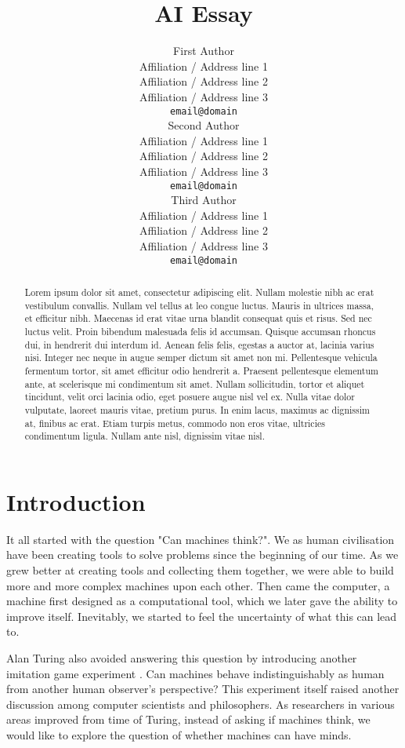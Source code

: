 \documentclass[11pt]{article}
\title{AI Essay}
\author{First Author \\
  Affiliation / Address line 1 \\
  Affiliation / Address line 2 \\
  Affiliation / Address line 3 \\
  {\tt email@domain} \\\And
  Second Author \\
  Affiliation / Address line 1 \\
  Affiliation / Address line 2 \\
  Affiliation / Address line 3 \\
  {\tt email@domain} \\\And
  Third Author \\
  Affiliation / Address line 1 \\
  Affiliation / Address line 2 \\
  Affiliation / Address line 3 \\
  {\tt email@domain} \\}
\date{}
\begin{document}
\maketitle
\begin{abstract}
Lorem ipsum dolor sit amet, consectetur adipiscing elit. Nullam molestie nibh ac erat vestibulum convallis. Nullam vel tellus at leo congue luctus. Mauris in ultrices massa, et efficitur nibh. Maecenas id erat vitae urna blandit consequat quis et risus. Sed nec luctus velit. Proin bibendum malesuada felis id accumsan. Quisque accumsan rhoncus dui, in hendrerit dui interdum id. Aenean felis felis, egestas a auctor at, lacinia varius nisi. Integer nec neque in augue semper dictum sit amet non mi. Pellentesque vehicula fermentum tortor, sit amet efficitur odio hendrerit a. Praesent pellentesque elementum ante, at scelerisque mi condimentum sit amet. Nullam sollicitudin, tortor et aliquet tincidunt, velit orci lacinia odio, eget posuere augue nisl vel ex. Nulla vitae dolor vulputate, laoreet mauris vitae, pretium purus. In enim lacus, maximus ac dignissim at, finibus ac erat. Etiam turpis metus, commodo non eros vitae, ultricies condimentum ligula. Nullam ante nisl, dignissim vitae nisl. 
\end{abstract}

\section{Introduction}
\label{sec:introduction}

It all started with the question "Can machines think?". We as human civilisation have been creating tools to solve problems since the beginning of our time. As we grew better at creating tools and collecting them together, we were able to build more and more complex machines upon each other. Then came the computer, a machine first designed as a computational tool, which we later gave the ability to improve itself. Inevitably, we started to feel the uncertainty of what this can lead to.

Alan Turing also  avoided answering this question by introducing another imitation game experiment \cite{turing1950computing}. Can machines behave indistinguishably as human from another human observer's perspective? This experiment itself raised another discussion among computer scientists and philosophers. As researchers in various areas improved from time of Turing, instead of asking if machines think, we would like to explore the question of whether machines can have minds.
\end{document}
